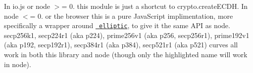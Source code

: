 In io.\+js or node $>$= 0. this module is just a shortcut to crypto.\+create\+ECDH. In node $<$= 0. or the browser this is a pure Java\+Script implimentation, more specifically a wrapper around \href{https://github.com/indutny/elliptic}{\texttt{ elliptic}}, to give it the same API as node. {\ttfamily secp256k1}, {\ttfamily secp224r1} (aka p224), {\ttfamily prime256v1} (aka p256, secp256r1), {\ttfamily prime192v1} (aka p192, secp192r1), {\ttfamily secp384r1} (aka p384), {\ttfamily secp521r1} (aka p521) curves all work in both this library and node (though only the highlighted name will work in node). 